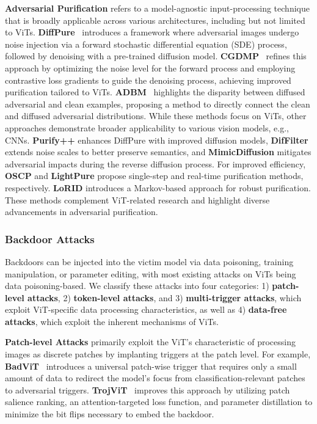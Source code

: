 \textbf{Adversarial Purification} refers to a model-agnostic input-processing technique that is broadly applicable across various architectures, including but not limited to ViTs.
\textbf{DiffPure}~\cite{nie2022diffusion} introduces a framework where adversarial images undergo noise injection via a forward stochastic differential equation (SDE) process, followed by denoising with a pre-trained diffusion model. \textbf{CGDMP}~\cite{bai2024diffusion} refines this approach by optimizing the noise level for the forward process and employing contrastive loss gradients to guide the denoising process, achieving improved purification tailored to ViTs. \textbf{ADBM}~\cite{li2024adbm} highlights the disparity between diffused adversarial and clean examples, proposing a method to directly connect the clean and diffused adversarial distributions.
While these methods focus on ViTs, other approaches demonstrate broader applicability to various vision models, e.g., CNNs. \textbf{Purify++}\cite{zhang2023purify++} enhances DiffPure with improved diffusion models, \textbf{DifFilter}\cite{chen2024diffilter} extends noise scales to better preserve semantics, and \textbf{MimicDiffusion}\cite{song2024mimicdiffusion} mitigates adversarial impacts during the reverse diffusion process. For improved efficiency, \textbf{OSCP}\cite{lei2024instant} and \textbf{LightPure}\cite{khalili2024lightpure} propose single-step and real-time purification methods, respectively. \textbf{LoRID}\cite{zollicoffer2024lorid} introduces a Markov-based approach for robust purification. These methods complement ViT-related research and highlight diverse advancements in adversarial purification.



\subsubsection{Backdoor Attacks }\label{sec:ViT-backdoor}
Backdoors can be injected into the victim model via data poisoning, training manipulation, or parameter editing, with most existing attacks on ViTs being data poisoning-based. 
We classify these attacks into four categories: 1) \textbf{patch-level attacks}, 2) \textbf{token-level attacks}, and 3) \textbf{multi-trigger attacks}, which exploit ViT-specific data processing characteristics, as well as 4) \textbf{data-free attacks}, which exploit the inherent mechanisms of ViTs.


\textbf{Patch-level Attacks} primarily exploit the ViT's characteristic of processing images as discrete patches by implanting triggers at the patch level. For example, \textbf{BadViT}~\cite{yuan2023you} introduces a universal patch-wise trigger that requires only a small amount of data to redirect the model's focus from classification-relevant patches to adversarial triggers. 
\textbf{TrojViT}~\cite{zheng2023trojvit} improves this approach by utilizing patch salience ranking, an attention-targeted loss function, and parameter distillation to minimize the bit flips necessary to embed the backdoor.

